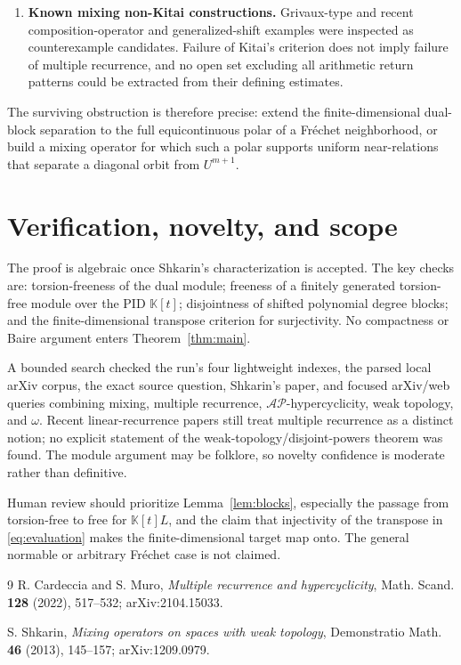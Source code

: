 \documentclass[11pt]{article}
\newcommand{\K}{\mathbb K}
\newcommand{\AP}{\mathcal{AP}}
\begin{document}
\begin{enumerate}
\item \textbf{Known mixing non-Kitai constructions.}  Grivaux-type and recent
composition-operator and generalized-shift examples were inspected as counterexample
candidates.  Failure of Kitai's criterion does not imply failure of multiple
recurrence, and no open set excluding all arithmetic return patterns could be
extracted from their defining estimates.
\end{enumerate}

The surviving obstruction is therefore precise: extend the finite-dimensional
dual-block separation to the full equicontinuous polar of a Fr\'echet
neighborhood, or build a mixing operator for which such a polar supports
uniform near-relations that separate a diagonal orbit from $U^{m+1}$.

\section{Verification, novelty, and scope}

The proof is algebraic once Shkarin's characterization is accepted.  The key
checks are: torsion-freeness of the dual module; freeness of a finitely
generated torsion-free module over the PID $\K[t]$; disjointness of shifted
polynomial degree blocks; and the finite-dimensional transpose criterion for
surjectivity.  No compactness or Baire argument enters Theorem~\ref{thm:main}.

A bounded search checked the run's four lightweight indexes, the parsed local
arXiv corpus, the exact source question, Shkarin's paper, and focused
arXiv/web queries combining mixing, multiple recurrence, $\AP$-hypercyclicity,
weak topology, and $\omega$.  Recent linear-recurrence papers still treat
multiple recurrence as a distinct notion; no explicit statement of the
weak-topology/disjoint-powers theorem was found.  The module argument may be
folklore, so novelty confidence is moderate rather than definitive.

Human review should prioritize Lemma~\ref{lem:blocks}, especially the passage
from torsion-free to free for $\K[t]L$, and the claim that injectivity of the
transpose in \eqref{eq:evaluation} makes the finite-dimensional target map
onto.  The general normable or arbitrary Fr\'echet case is not claimed.

\begin{thebibliography}{9}
R. Cardeccia and S. Muro,
\emph{Multiple recurrence and hypercyclicity},
Math. Scand. \textbf{128} (2022), 517--532;
arXiv:2104.15033.

S. Shkarin,
\emph{Mixing operators on spaces with weak topology},
Demonstratio Math. \textbf{46} (2013), 145--157;
arXiv:1209.0979.
\end{thebibliography}
\end{document}

